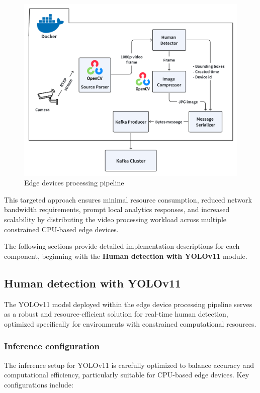 \begin{figure}[htbp]
    \centering
    \includegraphics[width=1\textwidth]{Figure/edges.png}
    \caption{Edge devices processing pipeline}
    \label{fig:edges}
\end{figure}

This targeted approach ensures minimal resource consumption, reduced network bandwidth requirements, prompt local analytics responses, and increased scalability by distributing the video processing workload across multiple constrained CPU-based edge devices.

The following sections provide detailed implementation descriptions for each component, beginning with the \textbf{Human detection with YOLOv11} module.

\subsection{Human detection with YOLOv11}
\label{sec:edge_human_detection}

The YOLOv11 model deployed within the edge device processing pipeline serves as a robust and resource-efficient solution for real-time human detection, optimized specifically for environments with constrained computational resources.

\subsubsection{Inference configuration}

The inference setup for YOLOv11 is carefully optimized to balance accuracy and computational efficiency, particularly suitable for CPU-based edge devices. Key configurations include:


